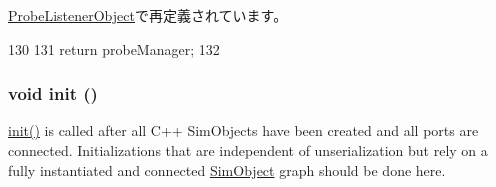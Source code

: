 \hyperlink{classProbeListenerObject_a4cdf821c3b87d8c0440d271b602fcdb5}{ProbeListenerObject}で再定義されています。


\begin{DoxyCode}
130 {
131     return probeManager;
132 }
\end{DoxyCode}
\hypertarget{classSimObject_a02fd73d861ef2e4aabb38c0c9ff82947}{
\subsubsection[{init}]{\setlength{\rightskip}{0pt plus 5cm}void init ()}}
\label{classSimObject_a02fd73d861ef2e4aabb38c0c9ff82947}
\hyperlink{classSimObject_a02fd73d861ef2e4aabb38c0c9ff82947}{init()} is called after all C++ SimObjects have been created and all ports are connected. Initializations that are independent of unserialization but rely on a fully instantiated and connected \hyperlink{classSimObject}{SimObject} graph should be done here. 

